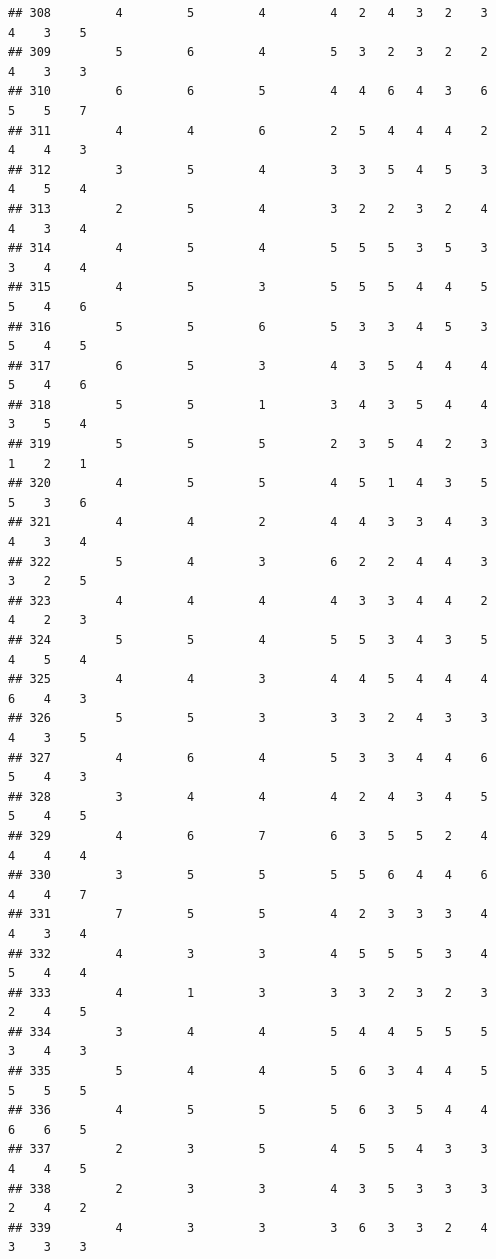 \documentclass[
]{article}
\begin{document}
\begin{verbatim}
## 308         4         5         4         4   2   4   3   2    3    4    3    5
## 309         5         6         4         5   3   2   3   2    2    4    3    3
## 310         6         6         5         4   4   6   4   3    6    5    5    7
## 311         4         4         6         2   5   4   4   4    2    4    4    3
## 312         3         5         4         3   3   5   4   5    3    4    5    4
## 313         2         5         4         3   2   2   3   2    4    4    3    4
## 314         4         5         4         5   5   5   3   5    3    3    4    4
## 315         4         5         3         5   5   5   4   4    5    5    4    6
## 316         5         5         6         5   3   3   4   5    3    5    4    5
## 317         6         5         3         4   3   5   4   4    4    5    4    6
## 318         5         5         1         3   4   3   5   4    4    3    5    4
## 319         5         5         5         2   3   5   4   2    3    1    2    1
## 320         4         5         5         4   5   1   4   3    5    5    3    6
## 321         4         4         2         4   4   3   3   4    3    4    3    4
## 322         5         4         3         6   2   2   4   4    3    3    2    5
## 323         4         4         4         4   3   3   4   4    2    4    2    3
## 324         5         5         4         5   5   3   4   3    5    4    5    4
## 325         4         4         3         4   4   5   4   4    4    6    4    3
## 326         5         5         3         3   3   2   4   3    3    4    3    5
## 327         4         6         4         5   3   3   4   4    6    5    4    3
## 328         3         4         4         4   2   4   3   4    5    5    4    5
## 329         4         6         7         6   3   5   5   2    4    4    4    4
## 330         3         5         5         5   5   6   4   4    6    4    4    7
## 331         7         5         5         4   2   3   3   3    4    4    3    4
## 332         4         3         3         4   5   5   5   3    4    5    4    4
## 333         4         1         3         3   3   2   3   2    3    2    4    5
## 334         3         4         4         5   4   4   5   5    5    3    4    3
## 335         5         4         4         5   6   3   4   4    5    5    5    5
## 336         4         5         5         5   6   3   5   4    4    6    6    5
## 337         2         3         5         4   5   5   4   3    3    4    4    5
## 338         2         3         3         4   3   5   3   3    3    2    4    2
## 339         4         3         3         3   6   3   3   2    4    3    3    3

\end{verbatim}
\end{document}
